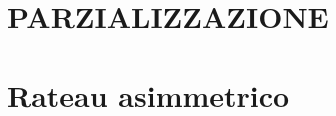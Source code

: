 \documentclass[a4paper, 15pt]{article}
\begin{document}
\section{PARZIALIZZAZIONE }

\section{Rateau asimmetrico}
%
\end{document}
